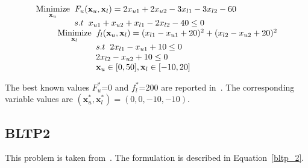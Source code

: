 \begin{equation}
\begin{array}{lr}
\underset{\mathbf{x}_u} {\text{Minimize}}\hspace{2mm} F_u(\mathbf{x}_u, \mathbf{ x}_l)=2x_{u1}+2x_{u2}-3x_{l1}-3x_{l2}-60\\

\hspace{16mm}s.t\hspace{2mm} x_{u1}+x_{u2}+x_{l1}-2x_{l2}-40\leq 0\\

\hspace{9mm} \underset{\mathbf{x}_l} {\text{Minimize}}\hspace{2mm} f_l(\mathbf{x}_u, \mathbf{ x}_l)=(x_{l1}-x_{u1}+20)^2+(x_{l2}-x_{u2}+20)^2 \\

\hspace{25mm}s.t\hspace{2mm} 2x_{l1}-x_{u1}+10\leq 0\\

\hspace{25mm}  2x_{l2}-x_{u2}+10 \leq 0\\

\hspace{25mm} \mathbf{x}_u \in {[0,50]},\mathbf{x}_l \in [-10,20] \\
\end{array}
\label{bltp_1}
\end{equation}

The best known values $F_u^*$=0 and  $f_l^*$=200 are reported in~\cite{Angelobilevel}. The corresponding variable values are $(\mathbf{x}^*_u, \mathbf{x}^*_l)=(0,0,-10,-10).$



\subsection{BLTP2}

This problem is taken from~\cite{bard1988convex}. The formulation is described in Equation~\ref{bltp_2}. 

